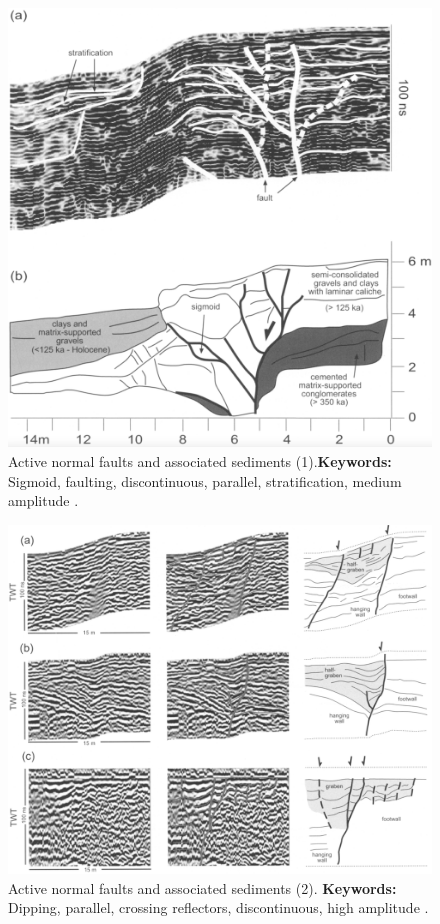 \begin{figure}[h!]
    \centering
    \includegraphics[width=0.9\linewidth]{Figures/0.2GPR/reiss2003_normal-faults_1.png}
    \caption[Active normal faults and associated sediments (1).]{Active normal faults and associated sediments (1).\textbf{Keywords: } Sigmoid, faulting, discontinuous, parallel, stratification, medium amplitude \citep{Reiss2003}.}
    \label{fig:Reiss2003-1}
\end{figure}

\begin{figure}[h!]
    \centering
    \includegraphics[width=0.9\linewidth]{Figures/0.2GPR/reiss2003_normal-faults_2.png}
    \caption[Active normal faults and associated sediments (2).]{Active normal faults and associated sediments (2). \textbf{Keywords: } Dipping, parallel, crossing reflectors, discontinuous, high amplitude \citep{Reiss2003}.}
    \label{fig:Reiss2003-2}
\end{figure}
